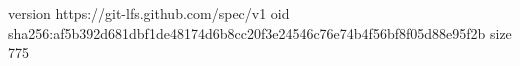 version https://git-lfs.github.com/spec/v1
oid sha256:af5b392d681dbf1de48174d6b8cc20f3e24546c76e74b4f56bf8f05d88e95f2b
size 775
